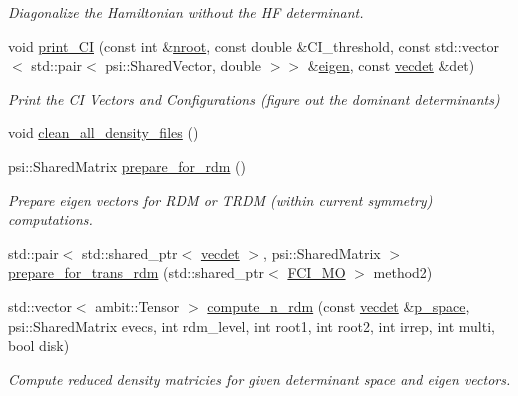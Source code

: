 \begin{DoxyCompactItemize}
\begin{DoxyCompactList}\small\item\em Diagonalize the Hamiltonian without the HF determinant. \end{DoxyCompactList}\item 
void \mbox{\hyperlink{classforte_1_1_f_c_i___m_o_a5186601ac16988bc980539e43adae269}{print\+\_\+\+CI}} (const int \&\mbox{\hyperlink{classforte_1_1_active_space_method_aa2bafc732bd7023fd32fbd263ef2e903}{nroot}}, const double \&C\+I\+\_\+threshold, const std\+::vector$<$ std\+::pair$<$ psi\+::\+Shared\+Vector, double $>$$>$ \&\mbox{\hyperlink{classforte_1_1_f_c_i___m_o_a7c37f298fb6cbe8870b75d5fa3faa7c9}{eigen}}, const \mbox{\hyperlink{fci__mo_8h_a777ccac2de1a8940d2f654e59ff12f06}{vecdet}} \&det)
\begin{DoxyCompactList}\small\item\em Print the CI Vectors and Configurations (figure out the dominant determinants) \end{DoxyCompactList}\item 
void \mbox{\hyperlink{classforte_1_1_f_c_i___m_o_afe404dd25f8dc9c49146677987e13aa2}{clean\+\_\+all\+\_\+density\+\_\+files}} ()
\item 
psi\+::\+Shared\+Matrix \mbox{\hyperlink{classforte_1_1_f_c_i___m_o_ae7bd478d88aacdef929f4432f6663676}{prepare\+\_\+for\+\_\+rdm}} ()
\begin{DoxyCompactList}\small\item\em Prepare eigen vectors for R\+DM or T\+R\+DM (within current symmetry) computations. \end{DoxyCompactList}\item 
std\+::pair$<$ std\+::shared\+\_\+ptr$<$ \mbox{\hyperlink{fci__mo_8h_a777ccac2de1a8940d2f654e59ff12f06}{vecdet}} $>$, psi\+::\+Shared\+Matrix $>$ \mbox{\hyperlink{classforte_1_1_f_c_i___m_o_a3e22d1614fc9b81bbf2c5360e41e581a}{prepare\+\_\+for\+\_\+trans\+\_\+rdm}} (std\+::shared\+\_\+ptr$<$ \mbox{\hyperlink{classforte_1_1_f_c_i___m_o}{F\+C\+I\+\_\+\+MO}} $>$ method2)
\item 
std\+::vector$<$ ambit\+::\+Tensor $>$ \mbox{\hyperlink{classforte_1_1_f_c_i___m_o_aa386ce9ea4166adf02c9a5ae57f0e7a9}{compute\+\_\+n\+\_\+rdm}} (const \mbox{\hyperlink{fci__mo_8h_a777ccac2de1a8940d2f654e59ff12f06}{vecdet}} \&\mbox{\hyperlink{classforte_1_1_f_c_i___m_o_a1c6e8fd8e4bcb8999665fa9ac17da1a0}{p\+\_\+space}}, psi\+::\+Shared\+Matrix evecs, int rdm\+\_\+level, int root1, int root2, int irrep, int multi, bool disk)
\begin{DoxyCompactList}\small\item\em Compute reduced density matricies for given determinant space and eigen vectors. \end{DoxyCompactList}\item 
$$
\end{DoxyCompactItemize}
